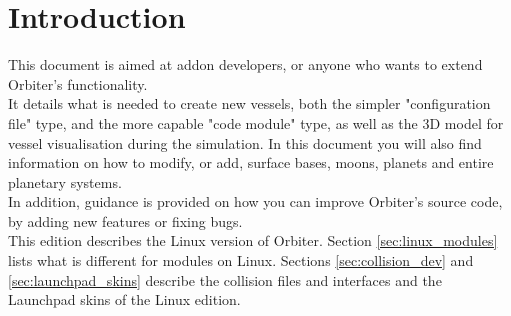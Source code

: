\documentclass[Orbiter Developer Manual.tex]{subfiles}
\begin{document}
\section{Introduction}
This document is aimed at addon developers, or anyone who wants to extend Orbiter's functionality.\\
It details what is needed to create new vessels, both the simpler "configuration file" type, and the more capable "code module" type, as well as the 3D model for vessel visualisation during the simulation.
In this document you will also find information on how to modify, or add, surface bases, moons, planets and entire planetary systems.\\
In addition, guidance is provided on how you can improve Orbiter's source code, by adding new features or fixing bugs.\\
This edition describes the Linux version of Orbiter. Section \ref{sec:linux_modules} lists what is different for modules on Linux. Sections \ref{sec:collision_dev} and \ref{sec:launchpad_skins} describe the collision files and interfaces and the Launchpad skins of the Linux edition.
\end{document}
